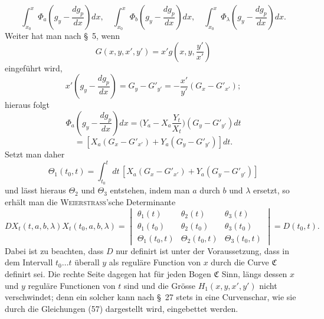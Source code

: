 \documentclass[11pt,a4paper,leqno]{article}
\begin{document}
\[
\int_{x_0}^{x}\Phi_a\left(g_y-\frac{dg_p}{dx}\right)dx,
\quad
\int_{x_0}^{x}\Phi_b\left(g_y-\frac{dg_p}{dx}\right)dx,
\quad
\int_{x_0}^{x}\Phi_\lambda\left(g_y-\frac{dg_p}{dx}\right)dx.
\]
Weiter hat man nach \S~5, wenn
\[
G(x,y,x',y')=x'g\left(x,y,\frac{y'}{x'}\right)
\]
eingeführt wird,
\[
x'\left(g_y-\frac{dg_p}{dx}\right)=G_y-G'_{y'}=-\frac{x'}{y'}(G_x-G'_{x'});
\]
hieraus folgt
\[
\Phi_a\left(g_y-\frac{dg_p}{dx}\right)dx=\biggl(Y_a-X_a\frac{Y_t}{X_t}\biggr)(G_y-G'_{y'})dt
\]
\[
=[X_a(G_x-G'_{x'})+Y_a(G_y-G'_{y'})]dt.
\]
Setzt man daher
\[
\Theta_1(t_0,t)=\int_{t_0}^{t}dt\,[X_a(G_x-G'_{x'})+Y_a(G_y-G'_{y'})]
\]
und lässt hieraus $\Theta_2$ und $\Theta_3$ entstehen, indem man $a$ durch $b$ und $\lambda$ ersetzt, so erhält man die \textsc{Weierstrass}'sche Determinante
\[
D X_t(t,a,b,\lambda)X_t(t_0,a,b,\lambda)=
\begin{vmatrix}
\theta_1(t)&\theta_2(t)&\theta_3(t)\\
\theta_1(t_0)&\theta_2(t_0)&\theta_3(t_0)\\
\Theta_1(t_0,t)&\Theta_2(t_0,t)&\Theta_3(t_0,t)
\end{vmatrix}=D(t_0,t).
\]
Dabei ist zu beachten, dass $D$ nur definirt ist unter der Voraussetzung, dass in dem Intervall $t_0\ldots t$ überall $y$ als reguläre Function von $x$ durch die Curve $\mathfrak{C}$ definirt sei. Die rechte Seite dagegen hat für jeden Bogen $\mathfrak{C}$ Sinn, längs dessen $x$ und $y$ reguläre Functionen von $t$ sind und die Grösse $H_1(x,y,x',y')$ nicht verschwindet; denn ein solcher kann nach \S~27 stets in eine Curvenschar, wie sie durch die Gleichungen (57) dargestellt wird, eingebettet werden.
\end{document}
